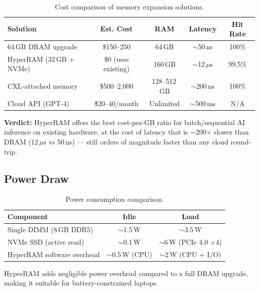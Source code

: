 \documentclass[11pt,a4paper]{article}
\newcommand{\micro}{$\mu$}
\begin{document}
\begin{table}[htbp]
\centering
\caption{Cost comparison of memory expansion solutions.}
\label{tab:cost}
\begin{tabular}{lcccc}
\toprule
\textbf{Solution} & \textbf{Est. Cost} & \textbf{RAM} & \textbf{Latency} & \textbf{Hit Rate} \\
\midrule
64\,GB DRAM upgrade & \$150--250 & 64\,GB & $\sim$50\,ns & 100\% \\
HyperRAM (32\,GB + NVMe) & \$0 (uses existing) & 160\,GB & $\sim$12\,\micro{}s & 99.5\% \\
CXL-attached memory & \$500--2{,}000 & 128--512\,GB & $\sim$200\,ns & 100\% \\
Cloud API (GPT-4) & \$20--40/month & Unlimited & $\sim$500\,ms & N/A \\
\bottomrule
\end{tabular}
\end{table}

\textbf{Verdict:} HyperRAM offers the best cost-per-GB ratio for batch/sequential AI inference on existing hardware, at the cost of latency that is $\sim$200$\times$ slower than DRAM (12\,\micro{}s vs 50\,ns) --- still orders of magnitude faster than any cloud round-trip.

\subsection{Power Draw}

\begin{table}[htbp]
\centering
\caption{Power consumption comparison.}
\label{tab:power}
\begin{tabular}{lcc}
\toprule
\textbf{Component} & \textbf{Idle} & \textbf{Load} \\
\midrule
Single DIMM (8\,GB DDR5) & $\sim$1.5\,W & $\sim$3.5\,W \\
NVMe SSD (active read) & $\sim$0.1\,W & $\sim$6\,W (PCIe 4.0 $\times$4) \\
HyperRAM software overhead & $\sim$0.5\,W (CPU) & $\sim$2\,W (CPU + I/O) \\
\bottomrule
\end{tabular}
\end{table}

HyperRAM adds negligible power overhead compared to a full DRAM upgrade, making it suitable for battery-constrained laptops.

\end{document}
